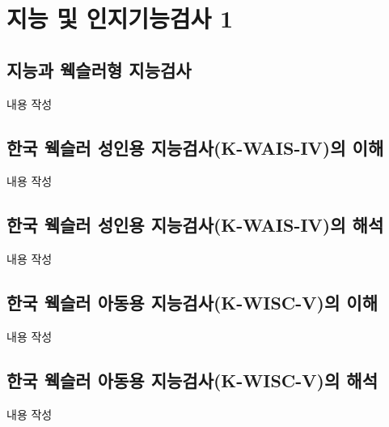 \section{지능 및 인지기능검사 1}

\subsection{지능과 웩슬러형 지능검사}
내용 작성

\subsection{한국 웩슬러 성인용 지능검사(K-WAIS-IV)의 이해}
내용 작성

\subsection{한국 웩슬러 성인용 지능검사(K-WAIS-IV)의 해석}
내용 작성

\subsection{한국 웩슬러 아동용 지능검사(K-WISC-V)의 이해}
내용 작성

\subsection{한국 웩슬러 아동용 지능검사(K-WISC-V)의 해석}
내용 작성
